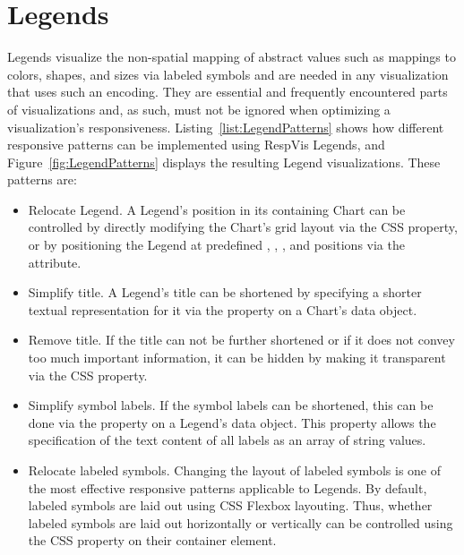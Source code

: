 \section{Legends}
\label{sec:LegendsUsage}

Legends visualize the non-spatial mapping of abstract values such as mappings to colors, shapes, and sizes via labeled symbols and are needed in any visualization that uses such an encoding.
They are essential and frequently encountered parts of visualizations and, as such, must not be ignored when optimizing a visualization's responsiveness. 
Listing~\ref{list:LegendPatterns} shows how different responsive patterns can be implemented using RespVis Legends, and Figure~\ref{fig:LegendPatterns} displays the resulting Legend visualizations.
These patterns are:

\begin{itemize}

\item
Relocate Legend.
A Legend's position in its containing Chart can be controlled by directly modifying the Chart's grid layout via the CSS  property, or by positioning the Legend at predefined , , , and  positions via the  attribute.

\item
Simplify title.
A Legend's title can be shortened by specifying a shorter textual representation for it via the  property on a Chart's data object.

\item
Remove title.
If the title can not be further shortened or if it does not convey too much important information, it can be hidden by making it transparent via the CSS  property.

\item
Simplify symbol labels.
If the symbol labels can be shortened, this can be done via the  property on a Legend's data object.
This property allows the specification of the text content of all labels as an array of string values.

\item
Relocate labeled symbols.
Changing the layout of labeled symbols is one of the most effective responsive patterns applicable to Legends.
By default, labeled symbols are laid out using CSS Flexbox layouting.
Thus, whether labeled symbols are laid out horizontally or vertically can be controlled using the CSS  property on their container element.

\end{itemize}

